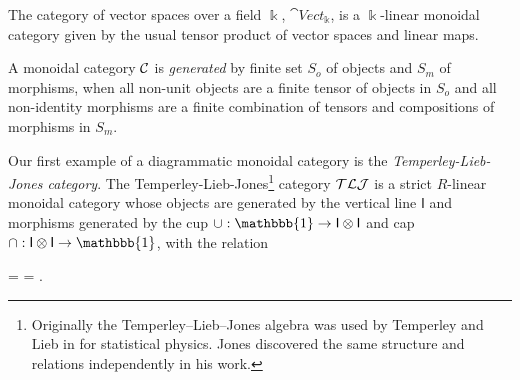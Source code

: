\begin{example}
    The category of vector spaces over a field $\Bbbk$, $\cat{Vect}_\Bbbk$, is a $\Bbbk$-linear monoidal category given by the usual tensor product of vector spaces and linear maps.
\end{example}

\begin{definition}
    A monoidal category $\mathcal{C}$ is \textit{generated} by finite set $S_o$ of objects and $S_m$ of morphisms, when all non-unit objects are a finite tensor of objects in $S_o$ and all non-identity morphisms are a finite combination of tensors and compositions of morphisms in $S_m$.
\end{definition}

\begin{example}
    \label{eg:tlj-category}
    Our first example of a diagrammatic monoidal category is the \textit{Temperley-Lieb-Jones category}. The Temperley-Lieb-Jones\footnote{Originally the Temperley--Lieb--Jones algebra was used by Temperley and Lieb in \cite{temperley-lieb-algebra-lattices} for statistical physics. Jones discovered the same structure and relations independently in his work.} category $\mathcal{TLJ}$ is a strict $R$-linear monoidal category whose objects are generated by the vertical line $\mathsf{I}$ and morphisms generated by the cup $\cup: \mathbbb{1} \to \mathsf{I} \tensor \mathsf{I}$ and cap $\cap: \mathsf{I} \tensor \mathsf{I} \to \mathbbb{1}$, with the relation
    \begin{center}
        = 
        = .
    \end{center}





\end{example}


















